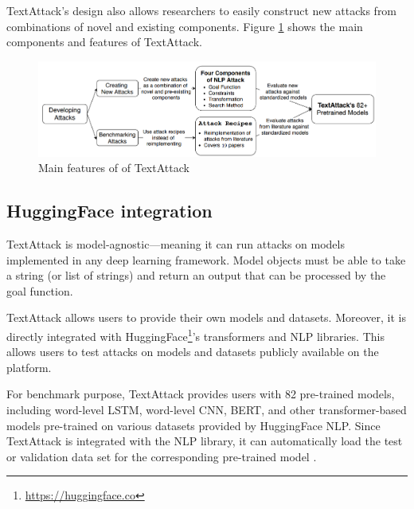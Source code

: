 TextAttack's design also allows researchers to easily construct new attacks from combinations of novel and existing components.
Figure \ref{fig:2_4_textattack} shows the main components and features of TextAttack.

\begin{figure}[h]
    \centering
    \includegraphics[width=0.9\linewidth]{images/2_4_textattack.png}
    \caption{Main features of of TextAttack}
    \label{fig:2_4_textattack}
\end{figure}

\subsection{HuggingFace integration}\label{subsec:huggingface-integration}

TextAttack is model-agnostic---meaning it
can run attacks on models implemented in any deep learning framework. Model objects must be able to take a string (or list of strings) and return an output that can be processed by the goal function.

TextAttack allows users to provide their own models and datasets. Moreover, it is directly integrated with HuggingFace\footnote{\url{https://huggingface.co}}'s transformers and NLP libraries. This allows users to test attacks on models and datasets publicly available on the platform. 

For benchmark purpose, TextAttack provides users with 82 pre-trained models, including word-level LSTM, word-level CNN, BERT, and other transformer-based models pre-trained on various datasets provided by HuggingFace NLP. Since TextAttack is integrated with the NLP library, it can automatically load the test or validation data set for the corresponding pre-trained model \cite{journals/corr/abs-2005-05909}. 